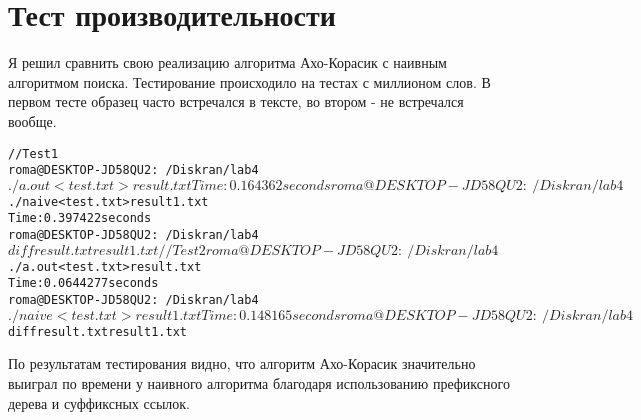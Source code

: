 \section{Тест производительности}
{\itshape}

Я решил сравнить свою реализацию алгоритма Ахо-Корасик с наивным алгоритмом поиска. Тестирование происходило на тестах с 
миллионом слов. В первом тесте образец часто встречался в тексте, во втором - не встречался вообще.

\begin{alltt}
// Test 1
roma@DESKTOP-JD58QU2:~/Diskran/lab4$ ./a.out <test.txt >result.txt
Time: 0.164362 seconds
roma@DESKTOP-JD58QU2:~/Diskran/lab4$ ./naive <test.txt >result1.txt
Time: 0.397422 seconds
roma@DESKTOP-JD58QU2:~/Diskran/lab4$ diff result.txt result1.txt

// Test 2
roma@DESKTOP-JD58QU2:~/Diskran/lab4$ ./a.out <test.txt >result.txt
Time: 0.0644277 seconds
roma@DESKTOP-JD58QU2:~/Diskran/lab4$ ./naive <test.txt >result1.txt
Time: 0.148165 seconds
roma@DESKTOP-JD58QU2:~/Diskran/lab4$ diff result.txt result1.txt

\end{alltt}

По результатам тестирования видно, что алгоритм Ахо-Корасик значительно выиграл по времени у наивного алгоритма благодаря 
использованию префиксного дерева и суффиксных ссылок.
\pagebreak

